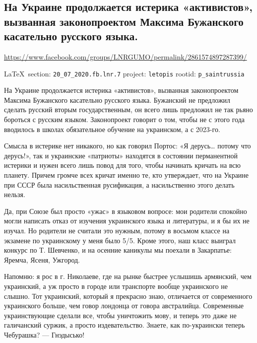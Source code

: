  
 

\subsection{
На Украине продолжается истерика «активистов», вызванная законопроектом Максима Бужанского касательно русского языка.}
\url{https://www.facebook.com/groups/LNRGUMO/permalink/2861574897287399/}
  
\vspace{0.5cm}
{\small\LaTeX~section: \verb|20_07_2020.fb.lnr.7| project: \verb|letopis| rootid: \verb|p_saintrussia|}
\vspace{0.5cm}

На Украине продолжается истерика «активистов», вызванная законопроектом Максима
Бужанского касательно русского языка. Бужанский не предложил сделать русский
вторым государственным, он всего лишь предложил не так рьяно бороться с русским
языком. Законопроект говорит о том, чтобы не с этого года вводилось в школах
обязательное обучение на украинском, а с 2023-го.

Смысла в истерике нет никакого, но как говорил Портос: «Я дерусь… потому что
дерусь!», так и украинские «патриоты» находятся в состоянии перманентной
истерики и нужен всего лишь повод для того, чтобы начинать кричать на всю
планету. Причем громче всех кричат именно те, кто утверждает, что на Украине
при СССР была насильственная русификация, а насильственно этого делать нельзя.

Да, при Союзе был просто «ужас» в языковом вопросе: мои родители спокойно могли
написать отказ от изучения украинского языка и литературы, и я бы их не изучал.
Но родители не считали это нужным, потому в восьмом классе на экзамене по
украинскому у меня было 5/5. Кроме этого, наш класс выиграл конкурс по Т.
Шевченко, и на осенние каникулы мы поехали в Закарпатье: Яремча, Ясеня,
Ужгород.

Напомню: я рос в г. Николаеве, где на рынке быстрее услышишь армянский, чем
украинский, а уж просто в городе или транспорте вообще украинского не слышно.
Тот украинский, который я прекрасно знаю, отличается от современного
украинского больше, чем говор лондонца от говора австралийца. Современные
украинствующие сделали все, чтобы уничтожить мову, и теперь это даже не
галичанский суржик, а просто издевательство. Знаете, как по-украински теперь
Чебурашка? --- Гнэдысько!

